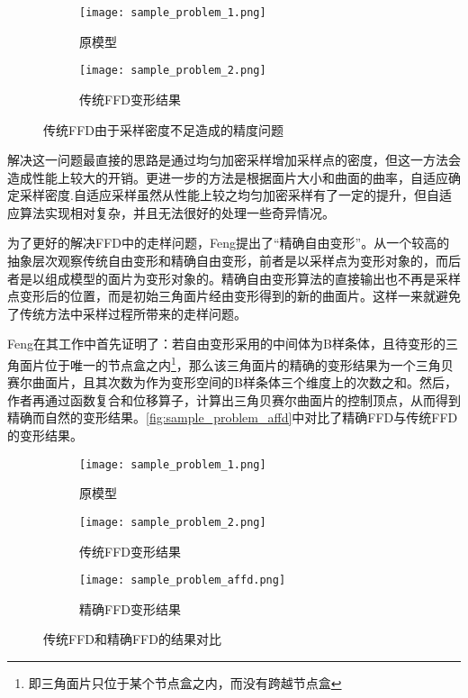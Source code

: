 \begin{figure}[htbp]
	\centering
	\begin{subfigure}[b]{.4\textwidth}
		\centering
		\texttt{[image: sample\_problem\_1.png]}
		\caption{原模型}\label{subfig:sample_problem_0}
	\end{subfigure}
	\quad
	\begin{subfigure}[b]{.4\textwidth}
		\centering
		\texttt{[image: sample\_problem\_2.png]}
		\caption{传统FFD变形结果}\label{subfig:sample_problem_1}
	\end{subfigure}
    \caption{传统FFD由于采样密度不足造成的精度问题}\label{fig:sample_problem}
\end{figure}

    解决这一问题最直接的思路是通过均匀加密采样增加采样点的密度，但这一方法会造成性能上较大的开销。更进一步的方法\cite{parry1986, gain1999}是根据面片大小和曲面的曲率，自适应确定采样密度.自适应采样虽然从性能上较之均匀加密采样有了一定的提升，但自适应算法实现相对复杂，并且无法很好的处理一些奇异情况。

    为了更好的解决FFD中的走样问题，Feng\cite{Feng98}提出了“精确自由变形”。从一个较高的抽象层次观察传统自由变形和精确自由变形，前者是以采样点为变形对象的，而后者是以组成模型的面片为变形对象的。精确自由变形算法的直接输出也不再是采样点变形后的位置，而是初始三角面片经由变形得到的新的曲面片。这样一来就避免了传统方法中采样过程所带来的走样问题。

    Feng在其工作中首先证明了：若自由变形采用的中间体为B样条体，且待变形的三角面片位于唯一的节点盒之内\footnote{即三角面片只位于某个节点盒之内，而没有跨越节点盒}，那么该三角面片的精确的变形结果为一个三角贝赛尔曲面片，且其次数为作为变形空间的B样条体三个维度上的次数之和。然后，作者再通过函数复合\cite{derose1988, derose1993}和位移算子\cite{chang1984}，计算出三角贝赛尔曲面片的控制顶点，从而得到精确而自然的变形结果。\autoref{fig:sample_problem_affd}中对比了精确FFD与传统FFD的变形结果。


\begin{figure}[htbp]
	\centering
	\begin{subfigure}[b]{.3\textwidth}
		\centering
		\texttt{[image: sample\_problem\_1.png]}
		\caption{原模型}
	\end{subfigure}
	\quad
	\begin{subfigure}[b]{.3\textwidth}
		\centering
		\texttt{[image: sample\_problem\_2.png]}
		\caption{传统FFD变形结果}
	\end{subfigure}
	\quad
	\begin{subfigure}[b]{.3\textwidth}
		\centering
		\texttt{[image: sample\_problem\_affd.png]}
		\caption{精确FFD变形结果}
	\end{subfigure}
    \caption{传统FFD和精确FFD的结果对比}\label{fig:sample_problem_affd}
\end{figure}

